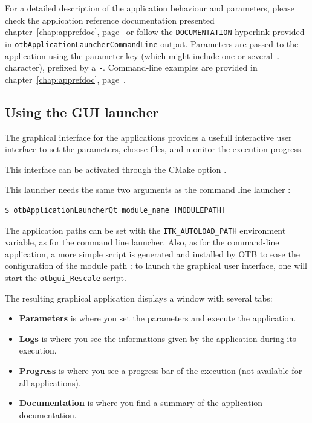 For a detailed description of the application behaviour and
parameters, please check the application reference documentation presented
chapter~\ref{chap:apprefdoc}, page~\pageref{chap:apprefdoc} or
follow the \verb?DOCUMENTATION? hyperlink provided in
\verb?otbApplicationLauncherCommandLine? output. Parameters are passed
to the application using the parameter key (which might include one or
several \verb?.? character), prefixed by a \verb?-?. Command-line
examples are provided in chapter~\ref{chap:apprefdoc},
page~\pageref{chap:apprefdoc}.


\subsection{Using the GUI launcher}

The graphical interface for the applications provides a usefull interactive user interface
to set the parameters, choose files, and monitor the execution progress.

This interface can be activated through the CMake option .

This launcher needs the same two arguments as the command line launcher :
\begin{verbatim}
$ otbApplicationLauncherQt module_name [MODULEPATH]
\end{verbatim}

The application paths can be set with the \verb?ITK_AUTOLOAD_PATH? environment variable,
as for the command line launcher.
Also, as for the command-line application, a more simple script is generated and installed by OTB
to ease the configuration of the module path : to launch the  graphical user interface,
one will start the \verb?otbgui_Rescale? script.

The resulting graphical application displays a window with several tabs:
\begin{itemize}
\item \textbf{Parameters} is where you set the parameters and 
execute the application. 
\item \textbf{Logs} is where you see the informations given by 
the application during its execution. 
\item \textbf{Progress} is where you see a progress bar of the 
execution (not available for all applications). 
\item \textbf{Documentation} is where you find a summary of the 
application documentation.
\end{itemize}

